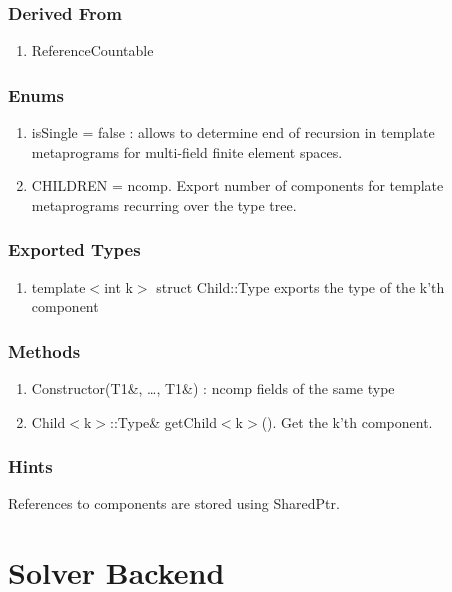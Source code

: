 \documentclass[11pt,a4paper,DIV11,%
notitlepage,oneside,abstracton,%
bibtotoc]{scrartcl}
\begin{document}
\subsubsection{Derived From}

\begin{enumerate}[1)]
\item ReferenceCountable
\end{enumerate}

\subsubsection{Enums}

\begin{enumerate}[1)]
\item isSingle = false : allows to determine end of recursion in
  template metaprograms for multi-field finite element spaces.
\item CHILDREN = ncomp. Export number of components for template
  metaprograms recurring over the type tree.
\end{enumerate}

\subsubsection{Exported Types}

\begin{enumerate}[1)]
\item template$<$int k$>$ struct Child::Type exports the type of
  the k'th component
\end{enumerate}

\subsubsection{Methods}

\begin{enumerate}[1)]
\item Constructor(T1\&, \ldots , T1\&) : ncomp fields of the same type
\item Child$<$k$>$::Type\& getChild$<$k$>$(). Get the k'th component.
\end{enumerate}

\subsubsection{Hints}

References to components are stored using SharedPtr.

\section{Solver Backend}
\end{document}
